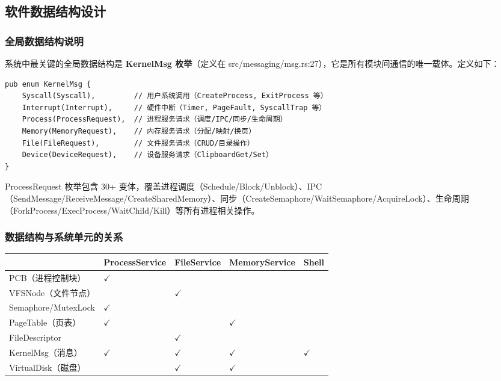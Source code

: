 \documentclass[UTF8,a4paper,12pt]{ctexart}
\begin{document}
\subsection{软件数据结构设计}

\subsubsection{全局数据结构说明}

系统中最关键的全局数据结构是 \textbf{KernelMsg 枚举}（定义在 src/messaging/msg.rs:27），它是所有模块间通信的唯一载体。定义如下：

\begin{lstlisting}[]
pub enum KernelMsg {
    Syscall(Syscall),         // 用户系统调用（CreateProcess, ExitProcess 等）
    Interrupt(Interrupt),     // 硬件中断（Timer, PageFault, SyscallTrap 等）
    Process(ProcessRequest),  // 进程服务请求（调度/IPC/同步/生命周期）
    Memory(MemoryRequest),    // 内存服务请求（分配/映射/换页）
    File(FileRequest),        // 文件服务请求（CRUD/目录操作）
    Device(DeviceRequest),    // 设备服务请求（ClipboardGet/Set）
}
\end{lstlisting}

ProcessRequest 枚举包含 30+ 变体，覆盖进程调度（Schedule/Block/Unblock）、IPC（SendMessage/ReceiveMessage/CreateSharedMemory）、同步（CreateSemaphore/WaitSemaphore/AcquireLock）、生命周期（ForkProcess/ExecProcess/WaitChild/Kill）等所有进程相关操作。

\subsubsection{数据结构与系统单元的关系}

\begin{center}
\renewcommand{\arraystretch}{1.35}
\begin{tabularx}{0.95\textwidth}{|>{\centering\arraybackslash}p{3cm}|>{\centering\arraybackslash}X|>{\centering\arraybackslash}X|>{\centering\arraybackslash}X|>{\centering\arraybackslash}X|}
\hline
 & \textbf{ProcessService} & \textbf{FileService} & \textbf{MemoryService} & \textbf{Shell}\\
\hline
PCB（进程控制块） & $\checkmark$ & & & \\
\hline
VFSNode（文件节点） & & $\checkmark$ & & \\
\hline
Semaphore/MutexLock & $\checkmark$ & & & \\
\hline
PageTable（页表） & $\checkmark$ & & $\checkmark$ & \\
\hline
FileDescriptor & & $\checkmark$ & & \\
\hline
KernelMsg（消息） & $\checkmark$ & $\checkmark$ & $\checkmark$ & $\checkmark$ \\
\hline
VirtualDisk（磁盘） & & $\checkmark$ & $\checkmark$ & \\
\hline
\end{tabularx}
\end{center}
\end{document}
